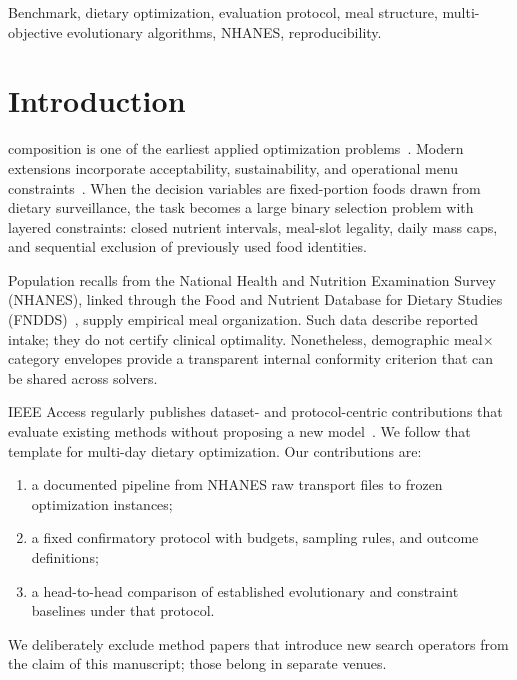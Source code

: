 \documentclass{ieeeaccess}
\begin{document}
\begin{keywords}
Benchmark, dietary optimization, evaluation protocol, meal structure, multi-objective evolutionary algorithms, NHANES, reproducibility.
\end{keywords}

\titlepgskip=-21pt
\maketitle

\section{Introduction}
\label{sec:introduction}
 composition is one of the earliest applied optimization problems~\cite{stigler1945}. Modern extensions incorporate acceptability, sustainability, and operational menu constraints~\cite{dooren2018,gazan2018,seljak2009,benvenuti2020}. When the decision variables are fixed-portion foods drawn from dietary surveillance, the task becomes a large binary selection problem with layered constraints: closed nutrient intervals, meal-slot legality, daily mass caps, and sequential exclusion of previously used food identities.

Population recalls from the National Health and Nutrition Examination Survey (NHANES), linked through the Food and Nutrient Database for Dietary Studies (FNDDS)~\cite{cdcDietary,usdaFndds}, supply empirical meal organization. Such data describe reported intake; they do not certify clinical optimality. Nonetheless, demographic meal$\times$category envelopes provide a transparent internal conformity criterion that can be shared across solvers.

IEEE Access regularly publishes dataset- and protocol-centric contributions that evaluate existing methods without proposing a new model~\cite{dales2021,cduie2023,nasbenchnlp2022,metaheuristics2021}. We follow that template for multi-day dietary optimization. Our contributions are:
\begin{enumerate}
\item a documented pipeline from NHANES raw transport files to frozen optimization instances;
\item a fixed confirmatory protocol with budgets, sampling rules, and outcome definitions;
\item a head-to-head comparison of established evolutionary and constraint baselines under that protocol.
\end{enumerate}
We deliberately exclude method papers that introduce new search operators from the claim of this manuscript; those belong in separate venues.
\end{document}
